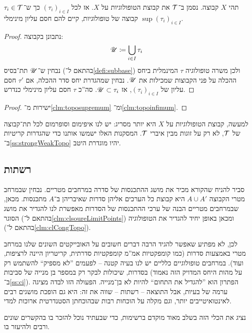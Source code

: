 \documentclass[name=רשימות טופולוגיה כללית]{../../../tex/classes/noChapterMegasumPreamble}
\begin{document}
	\begin{Claim}\label{clm:toposupremum}
		תהי $X$ קבוצה. נסמן ב־$\mathcal{T}$ את קבוצת הטופולוגיות על $X$. אז לכל $(\tau_i)_{i \in I}$ כך ש־$\tau_i \in \mathcal{T}$ קבוצה של טופולוגיות, קיים להם חסם עליון מינימלי $\sup (\tau_i)_{i \in I}$. 
	\end{Claim}\begin{proof}
		נתבונן בקבוצה: 
		\[ \mathscr{U} \coloneqq \bigcup_{i \in I}\tau_i \]
		נבחין ש־$\mathscr{U}$ תת־בסיס (בהתאם ל־\ref{defi:subbase}) ולכן משרה טופולוגיה $\tau$ המינמלית ביחס ההכלה על פני הקבוצות שמכילות את $\mathscr{U}$. נבחין שמהגדרת יחס סדר ההכלה, אם $\tau'$ חסם עליון של $(\tau_i)_{i \in I}$, אז $\mathscr{U}\subset \tau_i$. סה''כ $\tau$ חסם עליון מינימלי כנדרש. 
	\end{proof}
	\begin{proof}
		ישירות מ־\ref{clm:toposupremum} ומ־\ref{clm:topoinfimum}. 
	\end{proof}
	למעשה, קבוצת הטופולוגיות על $X$ היא יותר מסריג: יש לנו איפימום וסופרמום לכל תת־קבוצה של $\mathcal{T}$, לא רק על זוגות מבין איברי $\mathcal{T}$. המסקנות האלו ישמשו אותנו כדי שהגדרות קריטיות ב־\ref{ss:strongWeakTopo} יהיו מוגדרת היטב. 
	
\subsection{\label{ss:nets}רשתות}
	סביר להניח שהקורא מכיר את מושג ההתכנסות של סדרה במרחבים מטריים. נבחין שבמרחב מטרי הקבוצה $A \cup A'$ היא קבוצת כל הערכים אליהן סדרות שאיבריהן ב־$A$ מתכנסות. מכאן, שבמרחבים מטריים הבנה של ערכי ההתכנסות של הסדרות מאפשרת לנו להגדיר את מושג הסוגר (בהתאם ל־\ref{clm:clsoureLimitPoints}) ומכאן באופן יחיד להגדיר את הטופולוגיה (בהתאם ל־\ref{clm:clCongTopo}). 
	
	לכן, לא מפתיע שאפשר להגיד הרבה דברים חשובים על האובייקטים השונים שלנו במרחב מטרי באמצעות סדרות (כמו קומפקטיות אמ''מ קומפקטיות סדרתית, קריטריון היינה לרציפות, ועוד). במרחבים טופולוגיים כלליים יש לנו בעיה קטנה – לפעמים ''לא מספיק`` להשתמש רק בסדרות, שיכולות לבקר רק במספר בן מנייה של סביבות (על מהות היחס המדויק הזה נאמוד ב־\ref{ss:ci}). הפתרון הוא ''להגדיל את התחום`` להיות לא בן־מנייה. הפעולה הזו לבדה מציגה ערמה של בעיות, אבל התוצאה – רשתות – שווה את זה: היא גם הופכת מושגים רבים לאינטואיטייבים יותר, וגם מקלה על הוכחות רבות שבהוכחתן הסטנדרטית ארוכות למדי. 
	
	נציג את הכלי הזה בשלב מאוד מוקדם ברשימות, כדי שבעתיד נוכל להזכר בו בהקשרים שונים ורבים ולהיעזר בו. 
	
\end{document}

